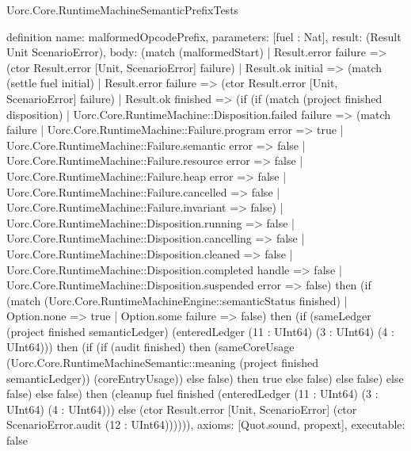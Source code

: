 \begin{lexlean}{Uorc.Core.RuntimeMachineSemanticPrefixTests}
\begin{semanticmodule}
definition{
  name: malformedOpcodePrefix,
  parameters: [fuel : Nat],
  result: (Result Unit ScenarioError),
  body: (match (malformedStart)
    | Result.error failure => (ctor Result.error [Unit, ScenarioError] failure)
    | Result.ok initial => (match (settle fuel initial)
      | Result.error failure => (ctor Result.error [Unit, ScenarioError] failure)
      | Result.ok finished => (if (if (match (project finished disposition)
        | Uorc.Core.RuntimeMachine::Disposition.failed failure => (match failure
          | Uorc.Core.RuntimeMachine::Failure.program error => true
          | Uorc.Core.RuntimeMachine::Failure.semantic error => false
          | Uorc.Core.RuntimeMachine::Failure.resource error => false
          | Uorc.Core.RuntimeMachine::Failure.heap error => false
          | Uorc.Core.RuntimeMachine::Failure.cancelled => false
          | Uorc.Core.RuntimeMachine::Failure.invariant => false)
        | Uorc.Core.RuntimeMachine::Disposition.running => false
        | Uorc.Core.RuntimeMachine::Disposition.cancelling => false
        | Uorc.Core.RuntimeMachine::Disposition.cleaned => false
        | Uorc.Core.RuntimeMachine::Disposition.completed handle => false
        | Uorc.Core.RuntimeMachine::Disposition.suspended error => false) then (if (match (Uorc.Core.RuntimeMachineEngine::semanticStatus finished)
        | Option.none => true
        | Option.some failure => false) then (if (sameLedger (project finished semanticLedger) (enteredLedger (11 : UInt64) (3 : UInt64) (4 : UInt64))) then (if (if (audit finished) then (sameCoreUsage (Uorc.Core.RuntimeMachineSemantic::meaning (project finished semanticLedger)) (coreEntryUsage)) else false) then true else false) else false) else false) else false) then (cleanup fuel finished (enteredLedger (11 : UInt64) (3 : UInt64) (4 : UInt64))) else (ctor Result.error [Unit, ScenarioError] (ctor ScenarioError.audit (12 : UInt64)))))),
  axioms: [Quot.sound, propext],
  executable: false
}


\end{semanticmodule}
\end{lexlean}
